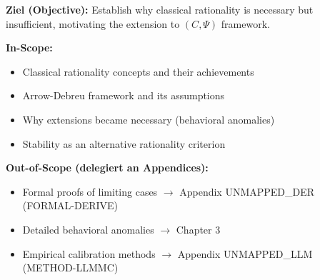 %
%
%
%
%

\begin{tcolorbox}[
    colback=purple!5!white,
    colframe=purple!75!black,
    title={\textbf{Chapter Scope: Ziel / In-Scope / Out-of-Scope}},
    fonttitle=\bfseries
]

\textbf{Ziel (Objective):}
Establish why classical rationality is necessary but insufficient, motivating the extension to $(C, \Psi)$ framework.

\vspace{0.3cm}
\textbf{In-Scope:}
\begin{itemize}[nosep]
    \item Classical rationality concepts and their achievements
    \item Arrow-Debreu framework and its assumptions
    \item Why extensions became necessary (behavioral anomalies)
    \item Stability as an alternative rationality criterion
\end{itemize}

\vspace{0.3cm}
\textbf{Out-of-Scope (delegiert an Appendices):}
\begin{itemize}[nosep]
    \item Formal proofs of limiting cases $\rightarrow$ Appendix UNMAPPED_DER (FORMAL-DERIVE)
    \item Detailed behavioral anomalies $\rightarrow$ Chapter 3
    \item Empirical calibration methods $\rightarrow$ Appendix UNMAPPED_LLM (METHOD-LLMMC)
\end{itemize}

\end{tcolorbox}

